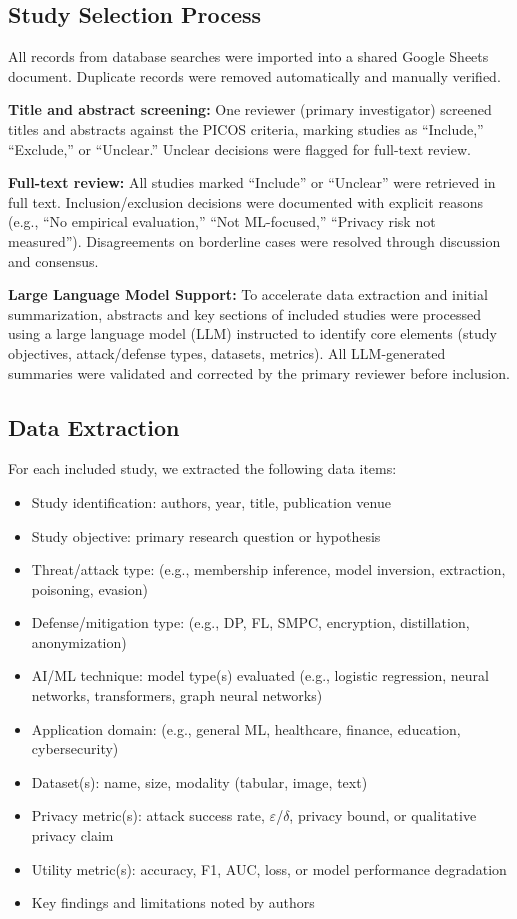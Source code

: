 \documentclass[11pt,a4paper]{article}
\begin{document}
\subsection{Study Selection Process}

All records from database searches were imported into a shared Google Sheets document. Duplicate records were removed automatically and manually verified.

\textbf{Title and abstract screening:} One reviewer (primary investigator) screened titles and abstracts against the PICOS criteria, marking studies as ``Include,'' ``Exclude,'' or ``Unclear.'' Unclear decisions were flagged for full-text review.

\textbf{Full-text review:} All studies marked ``Include'' or ``Unclear'' were retrieved in full text. Inclusion/exclusion decisions were documented with explicit reasons (e.g., ``No empirical evaluation,'' ``Not ML-focused,'' ``Privacy risk not measured''). Disagreements on borderline cases were resolved through discussion and consensus.

\textbf{Large Language Model Support:} To accelerate data extraction and initial summarization, abstracts and key sections of included studies were processed using a large language model (LLM) instructed to identify core elements (study objectives, attack/defense types, datasets, metrics). All LLM-generated summaries were validated and corrected by the primary reviewer before inclusion.

\subsection{Data Extraction}

For each included study, we extracted the following data items:
\begin{itemize}
\item Study identification: authors, year, title, publication venue
\item Study objective: primary research question or hypothesis
\item Threat/attack type: (e.g., membership inference, model inversion, extraction, poisoning, evasion)
\item Defense/mitigation type: (e.g., DP, FL, SMPC, encryption, distillation, anonymization)
\item AI/ML technique: model type(s) evaluated (e.g., logistic regression, neural networks, transformers, graph neural networks)
\item Application domain: (e.g., general ML, healthcare, finance, education, cybersecurity)
\item Dataset(s): name, size, modality (tabular, image, text)
\item Privacy metric(s): attack success rate, $\varepsilon$/$\delta$, privacy bound, or qualitative privacy claim
\item Utility metric(s): accuracy, F1, AUC, loss, or model performance degradation
\item Key findings and limitations noted by authors
\end{itemize}
\end{document}
